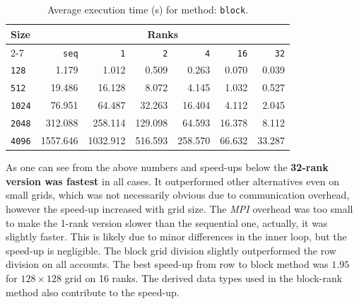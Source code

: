 \documentclass[11pt]{article}
\begin{document}
\begin{table}[H]
    \centering
    \begin{tabular}{|l|r|r|r|r|r|r|} \hline
        \cellcolor{blue!10}\textbf{Size} & \multicolumn{6}{c|}{\cellcolor{blue!10}\textbf{Ranks}} 
        \\ \cline{2-7}
        \cellcolor{blue!10} & \cellcolor{blue!20}\texttt{seq} & \cellcolor{blue!20}\texttt{1} & \cellcolor{blue!20}\texttt{2} & \cellcolor{blue!20}\texttt{4} & \cellcolor{blue!20}\texttt{16} & \cellcolor{blue!20}\texttt{32} \\ \hline
        \texttt{128}  & \cellcolor{red!20}1.179   & 1.012   & 0.509   & 0.263   & 0.070   & \cellcolor{green!20}0.039  \\ \hline
        \texttt{512}  & \cellcolor{red!20}19.486  & 16.128  & 8.072   & 4.145   & 1.032   & \cellcolor{green!20}0.527  \\ \hline
        \texttt{1024} & \cellcolor{red!20}76.951  & 64.487  & 32.263  & 16.404  & 4.112   & \cellcolor{green!20}2.045  \\ \hline
        \texttt{2048} & \cellcolor{red!20}312.088 & 258.114 & 129.098 & 64.593  & 16.378  & \cellcolor{green!20}8.112  \\ \hline
        \texttt{4096} & \cellcolor{red!20}1557.646 & 1032.912 & 516.593 & 258.570 & 66.632  & \cellcolor{green!20}33.287 \\ \hline
    \end{tabular}
    \caption{Average execution time (s) for method: \texttt{block}.}
\end{table}

As one can see from the above numbers and speed-ups below the \textbf{32-rank version was fastest} in all cases. It outperformed other alternatives even on small grids, which was not necessarily obvious due to communication overhead, however the speed-up increased with grid size. The \textit{MPI} overhead was too small to make the 1-rank version slower than the sequential one, actually, it was slightly faster. This is likely due to minor differences in the inner loop, but the speed-up is negligible. The block grid division slightly outperformed the row division on all accounts. The best speed-up from row to block method was $1.95$ for $128 \times 128$ grid on 16 ranks. The derived data types used in the block-rank method also contribute to the speed-up.
\end{document}

